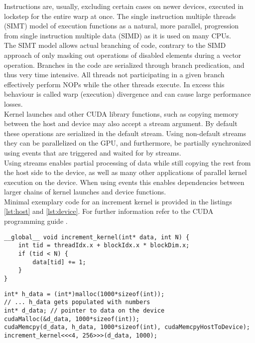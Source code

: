 \documentclass{tudscrreprt}
\newcommand{\markr}[1]{\textcolor{review}{$\langle$#1$\rangle$}}
\begin{document}
				Instructions are, usually, excluding certain cases on newer devices, executed in lockstep for the entire warp at once. The single instruction multiple threads (SIMT) model of execution functions as a natural, more parallel, progression from single instruction multiple data (SIMD) as it is used on many CPUs. \cite{simd_simt_smd} \\
				The SIMT model allows actual branching of code, contrary to the SIMD approach of only masking out operations of disabled elements during a vector operation. Branches in the code are serialized through branch predication, and thus very time intensive. All threads not participating in a given branch effectively perform NOPs while the other threads execute. In excess this behaviour is called warp (execution) divergence and can cause large performance losses. \\
				
				Kernel launches and other CUDA library functions, such as copying memory between the host and device may also accept a stream argument. By default these operations are serialized in the default stream. Using non-default streams they can be parallelized on the GPU, and furthermore, be partially synchronized using events that are triggered and waited for by streams. \\
				Using streams enables partial processing of data while still copying the rest from the host side to the device, as well as many other applications of parallel kernel execution on the device. When using events this enables dependencies between larger chains of kernel launches and device functions. \cite{cuda_streams_devblog, cuda_streams_events} \\
				
				Minimal exemplary code for an increment kernel is provided in the listings \ref{lst:host} and \ref{lst:device}. For further information refer to the CUDA programming guide \cite{cuda_programmingguide}. \\
				\newpage %
				\begin{lstlisting}[label=lst:host,caption=Device Side: Increment Kernel]
__global__ void increment_kernel(int* data, int N) {
	int tid = threadIdx.x + blockIdx.x * blockDim.x;
	if (tid < N) {
		data[tid] += 1;
	}
}
				\end{lstlisting}
				
				\begin{lstlisting}[label=lst:device,caption=Host Side: Device Malloc and Kernel Launch]
int* h_data = (int*)malloc(1000*sizeof(int));
// ... h_data gets populated with numbers
int* d_data; // pointer to data on the device
cudaMalloc(&d_data, 1000*sizeof(int));
cudaMemcpy(d_data, h_data, 1000*sizeof(int), cudaMemcpyHostToDevice);
increment_kernel<<<4, 256>>>(d_data, 1000);
				\end{lstlisting}
				
\end{document}
